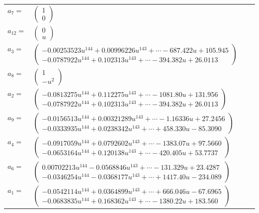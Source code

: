 \documentclass[1p]{elsarticle_modified}
\theoremstyle{definition}
\begin{document}
\begin{tabular}{m{7pt} m{180pt} m{7pt} m{180pt} }
\flushright $a_{7}=$&$\begin{pmatrix}1\\0\end{pmatrix}$ \\
\flushright $a_{12}=$&$\begin{pmatrix}0\\u\end{pmatrix}$ \\
\flushright $a_{3}=$&$\begin{pmatrix}-0.00253523 u^{144}+0.00996226 u^{143}+\cdots-687.422 u+105.945\\-0.0787922 u^{144}+0.102313 u^{143}+\cdots-394.382 u+26.0113\end{pmatrix}$ \\
\flushright $a_{8}=$&$\begin{pmatrix}1\\- u^2\end{pmatrix}$ \\
\flushright $a_{2}=$&$\begin{pmatrix}-0.0813275 u^{144}+0.112275 u^{143}+\cdots-1081.80 u+131.956\\-0.0787922 u^{144}+0.102313 u^{143}+\cdots-394.382 u+26.0113\end{pmatrix}$ \\
\flushright $a_{9}=$&$\begin{pmatrix}-0.0156513 u^{144}+0.00321289 u^{143}+\cdots-1.16336 u+27.2456\\-0.0333935 u^{144}+0.0238342 u^{143}+\cdots+458.330 u-85.3090\end{pmatrix}$ \\
\flushright $a_{4}=$&$\begin{pmatrix}-0.0917059 u^{144}+0.0792602 u^{143}+\cdots-1383.07 u+97.5660\\-0.0653164 u^{144}+0.120138 u^{143}+\cdots-420.405 u+53.7737\end{pmatrix}$ \\
\flushright $a_{6}=$&$\begin{pmatrix}0.00702213 u^{144}-0.0568846 u^{143}+\cdots-131.329 u+23.4287\\-0.0346254 u^{144}-0.0368177 u^{143}+\cdots+1417.40 u-234.089\end{pmatrix}$ \\
\flushright $a_{1}=$&$\begin{pmatrix}-0.0542114 u^{144}+0.0364899 u^{143}+\cdots+666.046 u-67.6965\\-0.0683835 u^{144}+0.168362 u^{143}+\cdots-1380.22 u+183.560\end{pmatrix}$ \\

\end{tabular}
\end{document}
